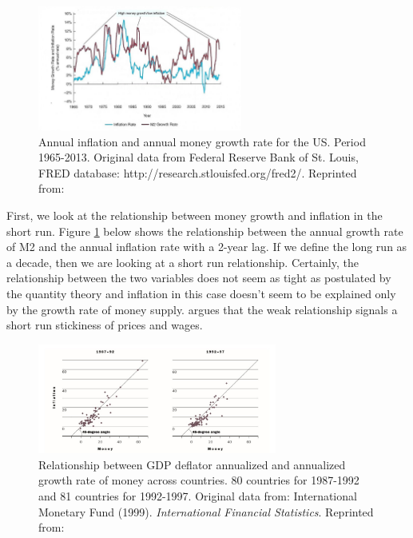 \documentclass[11pt,a4paper,oneside]{book}
\begin{document}
\begin{figure}[h!]
  \centering
    \includegraphics[width=0.60\textwidth]{SR_money_inflation.jpg}
    \caption{Annual inflation and annual money growth rate for the US. Period 1965-2013. Original data from Federal Reserve Bank of St. Louis, FRED database: http://research.stlouisfed.org/fred2/. Reprinted from: \citet*[p. 532]{Mishkin_2016}}
    \label{fig:SR_money_inflation}
\end{figure}

First, we look at the relationship between money growth and inflation in the short run. Figure \ref{fig:SR_money_inflation} below shows the relationship between the annual growth rate of M2 and the annual inflation rate with a 2-year lag. If we define the long run as a decade, then we are looking at a short run relationship. Certainly, the relationship between the two variables does not seem as tight as postulated by the quantity theory and inflation in this case doesn't seem to be explained only by the growth rate of money supply. \citet*[p. 530]{Mishkin_2016} argues that the weak relationship signals a short run stickiness of prices and wages.

\begin{figure}[h!]
  \centering
    \includegraphics[width=0.70\textwidth]{Money_inflation_across_countries.jpg}
    \caption{Relationship between GDP deflator annualized and annualized growth rate of money across countries. 80 countries for 1987-1992 and 81 countries for 1992-1997. Original data from: International Monetary Fund (1999). \textit{International Financial Statistics}. Reprinted from: \citet*[p. 40]{Dwyer_Hafer_1999}}
    \label{fig:money_inflation_countries}
\end{figure}
\end{document}

